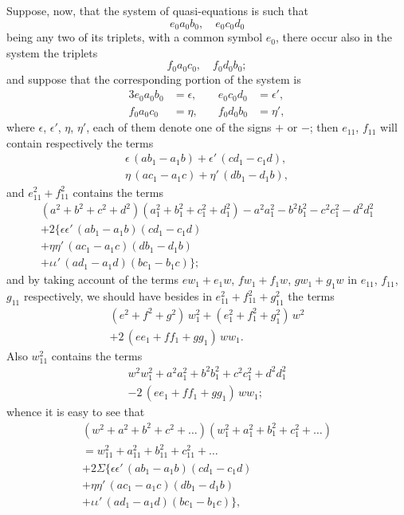 \documentclass[11pt,a4paper]{book}
\begin{document}
Suppose, now, that the system of quasi-equations is such that
\[
e_0 a_0 b_0, \quad e_0 c_0 d_0
\]
being any two of its triplets, with a common symbol $e_0$, there occur also in the system the triplets
\[
f_0 a_0 c_0, \quad f_0 d_0 b_0;
\]
and suppose that the corresponding portion of the system is
\begin{alignat*}{3}
e_0 a_0 b_0 &= \epsilon, \quad& e_0 c_0 d_0 &= \epsilon',\\
f_0 a_0 c_0 &= \eta, \quad& f_0 d_0 b_0 &= \eta',
\end{alignat*}
where $\epsilon$, $\epsilon'$, $\eta$, $\eta'$, each of them denote one of the signs $+$ or $-$; then $e_{11}$, $f_{11}$ will contain respectively the terms
\begin{align*}
\epsilon\,(ab_1-a_1b) + \epsilon'\,(cd_1-c_1d),\\
\eta\,(ac_1-a_1c) + \eta'\,(db_1-d_1b),
\end{align*}
and $e_{11}^2 + f_{11}^2$ contains the terms
\begin{multline*}
(a^2+b^2+c^2+d^2)(a_1^2+b_1^2+c_1^2+d_1^2) - a^2a_1^2 - b^2b_1^2 - c^2c_1^2 - d^2d_1^2\\
+ 2\{\epsilon\epsilon'\,(ab_1-a_1b)(cd_1-c_1d)\\
+ \eta\eta'\,(ac_1-a_1c)(db_1-d_1b)\\
+ \iota\iota'\,(ad_1-a_1d)(bc_1-b_1c)\};
\end{multline*}
and by taking account of the terms $ew_1+e_1w$, $fw_1+f_1w$, $gw_1+g_1w$ in $e_{11}$, $f_{11}$, $g_{11}$ respectively, we should have besides in $e_{11}^2+f_{11}^2+g_{11}^2$ the terms
\begin{multline*}
(e^2+f^2+g^2)\,w_1^2 + (e_1^2+f_1^2+g_1^2)\,w^2\\
+ 2\,(ee_1+ff_1+gg_1)\,ww_1.
\end{multline*}
Also $w_{11}^2$ contains the terms
\begin{multline*}
w^2w_1^2 + a^2a_1^2 + b^2b_1^2 + c^2c_1^2 + d^2d_1^2\\
- 2\,(ee_1+ff_1+gg_1)\,ww_1;
\end{multline*}
whence it is easy to see that
\begin{multline*}
(w^2+a^2+b^2+c^2+\ldots)(w_1^2+a_1^2+b_1^2+c_1^2+\ldots)\\
= w_{11}^2 + a_{11}^2 + b_{11}^2 + c_{11}^2 + \ldots\\
+ 2\Sigma\{\epsilon\epsilon'\,(ab_1-a_1b)(cd_1-c_1d)\\
+ \eta\eta'\,(ac_1-a_1c)(db_1-d_1b)\\
+ \iota\iota'\,(ad_1-a_1d)(bc_1-b_1c)\},
\end{multline*}
\end{document}
